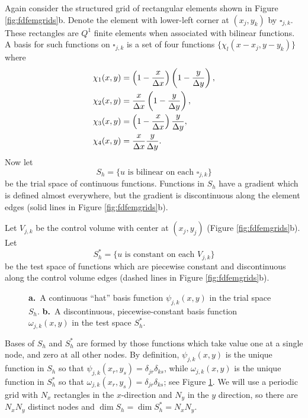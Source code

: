 \documentclass[twocolumn,letterpaper]{igs}
\begin{document}
Again consider the structured grid of rectangular elements shown in Figure \ref{fig:fdfemgrids}b.  Denote the element with lower-left corner at $(x_j,y_k)$ by $\square_{j,k}$.  These rectangles are $Q^1$ finite elements \citep{Elmanetal2005} when associated with bilinear functions.  A basis for such functions on $\square_{j,k}$ is a set of four functions $\{\chi_l(x-x_j,y-y_k)\}$ where
\begin{align}
\chi_1(x,y) &= \left(1-\frac{x}{\Delta x}\right) \left(1-\frac{y}{\Delta y}\right), \label{eq:elementbasis} \\
\chi_2(x,y) &= \frac{x}{\Delta x} \left(1-\frac{y}{\Delta y}\right), \notag \\
\chi_3(x,y) &= \left(1-\frac{x}{\Delta x}\right) \frac{y}{\Delta y}, \notag \\
\chi_4(x,y) &= \frac{x}{\Delta x} \frac{y}{\Delta y}. \notag
\end{align}
Now let
\begin{equation}
S_h = \{u \text{ is bilinear on each $\square_{j,k}$}\}
\end{equation}
be the trial space of continuous functions.  Functions in $S_h$ have a gradient which is defined almost everywhere, but the gradient is discontinuous along the element edges (solid lines in Figure \ref{fig:fdfemgrids}b).

Let $V_{j,k}$ be the control volume with center at $(x_j,y_j)$ (Figure \ref{fig:fdfemgrids}b).  Let
\begin{equation}
S_h^* = \{u \text{ is constant on each $V_{j,k}$}\}
\end{equation}
be the test space of functions which are piecewise constant and discontinuous along the control volume edges (dashed lines in Figure \ref{fig:fdfemgrids}b).

\begin{figure}[ht]
\begin{center}
 \quad 
\end{center}
\caption{\textbf{a.}~A continuous ``hat'' basis function $\psi_{j,k}(x,y)$ in the trial space $S_h$.  \textbf{b.}~A discontinuous, piecewise-constant basis function $\omega_{j,k}(x,y)$ in the test space $S_h^*$.}
\label{fig:fembases}
\end{figure}

Bases of $S_h$ and $S_h^*$ are formed by those functions which take value one at a single node, and zero at all other nodes.  By definition, $\psi_{j,k}(x,y)$ is the unique function in $S_h$ so that $\psi_{j,k}(x_r,y_s) = \delta_{jr} \delta_{ks}$, while $\omega_{j,k}(x,y)$ is the unique function in $S_h^*$ so that $\omega_{j,k}(x_r,y_s) = \delta_{jr} \delta_{ks}$; see Figure \ref{fig:fembases}.  We will use a periodic grid with $N_x$ rectangles in the $x$-direction and $N_y$ in the $y$ direction, so there are $N_xN_y$ distinct nodes and $\dim S_h = \dim S_h^* = N_x N_y$.  
\end{document}
